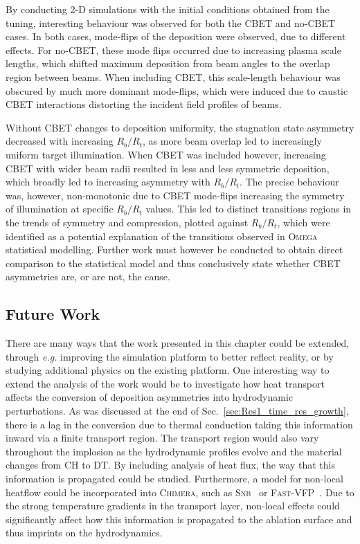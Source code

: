 By conducting 2-D simulations with the initial conditions obtained from the tuning, interesting behaviour was observed for both the \ac{CBET} and no-\ac{CBET} cases.
In both cases, mode-flips of the deposition were observed, due to different effects.
For no-\ac{CBET}, these mode flips occurred due to increasing plasma scale lengths, which shifted maximum deposition from beam angles to the overlap region between beams.
When including \ac{CBET}, this scale-length behaviour was obscured by much more dominant mode-flips, which were induced due to caustic \ac{CBET} interactions distorting the incident field profiles of beams.

Without \ac{CBET} changes to deposition uniformity, the stagnation state asymmetry decreased with increasing $R_b/R_t$, as more beam overlap led to increasingly uniform target illumination.
When \ac{CBET} was included however, increasing \ac{CBET} with wider beam radii resulted in less and less symmetric deposition, which broadly led to increasing asymmetry with $R_b/R_t$.
The precise behaviour was, however, non-monotonic due to \ac{CBET} mode-flips increasing the symmetry of illumination at specific $R_b/R_t$ values.
This led to distinct transitions regions in the trends of symmetry and compression, plotted against $R_b/R_t$, which were identified as a potential explanation of the transitions observed in \textsc{Omega} statistical modelling.
Further work must however be conducted to obtain direct comparison to the statistical model and thus conclusively state whether \ac{CBET} asymmetries are, or are not, the cause.

\subsection{Future Work}%
\label{sec:Res1_future}

There are many ways that the work presented in this chapter could be extended, through \textit{e.g.} improving the simulation platform to better reflect reality, or by studying additional physics on the existing platform.
One interesting way to extend the analysis of the work would be to investigate how heat transport affects the conversion of deposition asymmetries into hydrodynamic perturbations.
As was discussed at the end of Sec.~\ref{sec:Res1_time_res_growth}, there is a lag in the conversion due to thermal conduction taking this information inward via a finite transport region.
The transport region would also vary throughout the implosion as the hydrodynamic profiles evolve and the material changes from CH to DT.
By including analysis of heat flux, the way that this information is propagated could be studied.
Furthermore, a model for non-local heatflow could be incorporated into \textsc{Chimera}, such as \textsc{Snb}~\cite{schurtz_nonlocal_2000,nicolai_practical_2006,cao_improved_2015} or \textsc{Fast-VFP}~\cite{bell_fast_2024}.
Due to the strong temperature gradients in the transport layer, non-local effects could significantly affect how this information is propagated to the ablation surface and thus imprints on the hydrodynamics.

